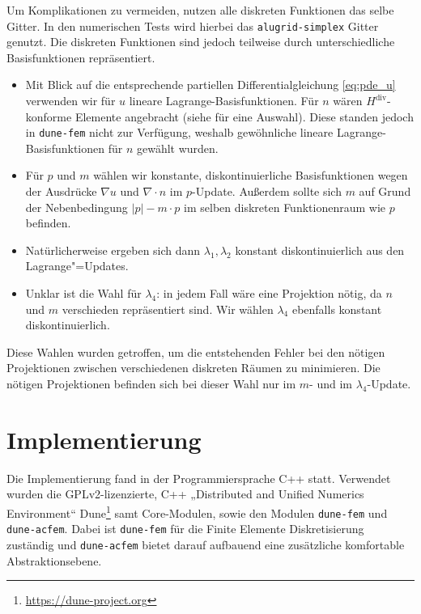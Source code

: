 \documentclass{mythesis}
\begin{document}
Um Komplikationen zu vermeiden, nutzen alle diskreten Funktionen das selbe Gitter.
In den numerischen Tests wird hierbei das \texttt{alugrid-simplex} Gitter \cite{alkamper2016dune} genutzt.
Die diskreten Funktionen sind jedoch teilweise durch unterschiedliche Basisfunktionen repräsentiert.
\begin{itemize}
    \item
	Mit Blick auf die entsprechende partiellen Differentialgleichung \eqref{eq:pde_u} verwenden wir für $u$ lineare Lagrange-Basisfunktionen.
	Für $n$ wären $H^{\mathrm{div}}$-konforme Elemente angebracht (siehe \cite[§3]{logg2012automated} für eine Auswahl).
        Diese standen jedoch in \texttt{dune-fem} nicht zur Verfügung, weshalb gewöhnliche lineare Lagrange-Basisfunktionen für $n$ gewählt wurden.
    \item
	Für $p$ und $m$ wählen wir konstante, diskontinuierliche Basisfunktionen wegen der Ausdrücke $\nabla u$ und $\nabla \cdot n$ im $p$-Update.
	Außerdem sollte sich $m$ auf Grund der Nebenbedingung $|p| - m\cdot p$ im selben diskreten Funktionenraum wie $p$ befinden.
    \item
	Natürlicherweise ergeben sich dann $\lambda_1, \lambda_2$ konstant diskontinuierlich aus den Lagrange"=Updates.
    \item
	Unklar ist die Wahl für $\lambda_4$: in jedem Fall wäre eine Projektion nötig, da $n$ und $m$ verschieden repräsentiert sind.
	Wir wählen $\lambda_4$ ebenfalls konstant diskontinuierlich.
\end{itemize}
Diese Wahlen wurden getroffen, um die entstehenden Fehler bei den nötigen Projektionen zwischen verschiedenen diskreten Räumen zu minimieren.
Die nötigen Projektionen befinden sich bei dieser Wahl nur im $m$- und im $\lambda_4$-Update.








\section{Implementierung}


Die Implementierung fand in der Programmiersprache C++ statt.
Verwendet wurden die GPLv2-lizenzierte, C++ „Distributed and Unified Numerics Environment“ Dune\footnote{\url{https://dune-project.org}} samt Core-Modulen, sowie den Modulen \texttt{dune-fem} und \texttt{dune-acfem}.
Dabei ist \texttt{dune-fem} für die Finite Elemente Diskretisierung zuständig und \texttt{dune-acfem} bietet darauf aufbauend eine zusätzliche komfortable Abstraktionsebene.
\end{document}
